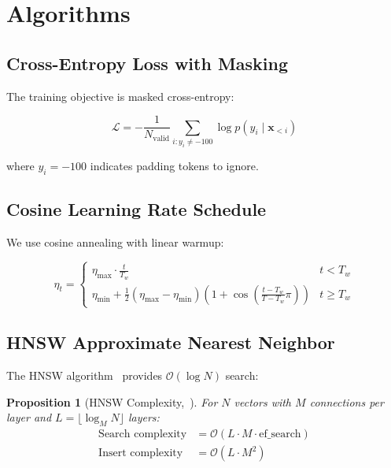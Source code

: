 \documentclass[11pt,a4paper]{article}
\theoremstyle{plain}
\newtheorem{proposition}[theorem]{Proposition}
\theoremstyle{definition}
\newcommand{\calL}{\mathcal{L}}
\newcommand{\calO}{\mathcal{O}}
\begin{document}
\section{Algorithms}
\label{sec:algorithms}

\subsection{Cross-Entropy Loss with Masking}

The training objective is masked cross-entropy:

\begin{equation}
    \calL = -\frac{1}{N_{\text{valid}}} \sum_{i : y_i \neq -100} \log p(y_i \mid \mathbf{x}_{<i})
    \label{eq:loss}
\end{equation}

where $y_i = -100$ indicates padding tokens to ignore.

\subsection{Cosine Learning Rate Schedule}

We use cosine annealing with linear warmup:

\begin{equation}
    \eta_t = \begin{cases}
        \eta_{\max} \cdot \frac{t}{T_w} & t < T_w \\
        \eta_{\min} + \frac{1}{2}(\eta_{\max} - \eta_{\min})\left(1 + \cos\left(\frac{t - T_w}{T - T_w}\pi\right)\right) & t \geq T_w
    \end{cases}
    \label{eq:cosine}
\end{equation}

\subsection{HNSW Approximate Nearest Neighbor}

The HNSW algorithm~\cite{malkov2018hnsw} provides $\calO(\log N)$ search:

\begin{proposition}[HNSW Complexity,~\cite{malkov2018hnsw}]
For $N$ vectors with $M$ connections per layer and $L = \lfloor \log_M N \rfloor$
layers:
\begin{align}
    \text{Search complexity} &= \calO(L \cdot M \cdot \text{ef\_search}) \\
    \text{Insert complexity} &= \calO(L \cdot M^2)
\end{align}
\end{proposition}
\end{document}
